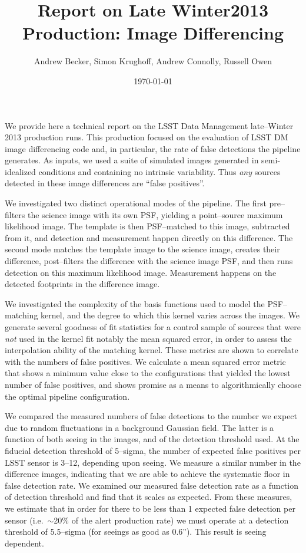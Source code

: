 \documentclass[prd, nofootinbib, floatfix, 11pt,tightenlines,times]{article}
\author{Andrew Becker, Simon Krughoff, Andrew Connolly, Russell Owen\vspace{-2ex}}
\title{Report on Late Winter2013 Production: Image Differencing\vspace{-2ex}}
\date{\vspace{-2ex}\today}
\begin{document}
\maketitle
\vspace{-2ex}
We provide here a technical report on the LSST Data Management
late--Winter 2013 production runs.  This production focused on the
evaluation of LSST DM image differencing code and, in particular, 
the rate of false detections the pipeline generates.  As
inputs, we used a suite of simulated images generated in semi-idealized
conditions and containing no intrinsic variability.  Thus {\it any}
sources detected in these image differences are ``false positives''.

We investigated two distinct operational modes of the pipeline.  The
first pre--filters the science image with its own PSF, yielding a
point--source maximum likelihood image.  The template is then
PSF--matched to this image, subtracted from it, and detection and
measurement happen directly on this difference.  The second mode
matches the template image to the science image, creates their
difference, post--filters the difference with the science image PSF,
and then runs detection on this maximum likelihood image.  Measurement
happens on the detected footprints in the difference image.  

We investigated the complexity of the basis functions used to model
the PSF--matching kernel, and the degree to which this kernel varies
across the images.  We generate several goodness of fit statistics for
a control sample of sources that were {\it not} used in the kernel fit
notably the mean squared error, in order to assess the interpolation ability
of the matching kernel.  These metrics are shown to correlate with the
numbers of false positives.  We calculate a mean squared error metric
that shows a minimum value close to the configurations that yielded
the lowest number of false positives, and shows promise as a means to
algorithmically choose the optimal pipeline configuration.

We compared the measured numbers of false detections to the number we
expect due to random fluctuations in a background Gaussian field.  The
latter is a function of both seeing in the images, and of the
detection threshold used.  At the fiducial detection threshold of
5--sigma, the number of expected false positives per LSST sensor is
3--12, depending upon seeing.  We measure a similar number in the
difference images, indicating that we are able to achieve the
systematic floor in false detection rate.  We examined our measured
false detection rate as a function of detection threshold and find
that it scales as expected.  From these measures, we estimate that in
order for there to be less than 1 expected false detection per sensor
(i.e.\ $\sim$20\% of the alert production rate) we must operate at a
detection threshold of 5.5--sigma (for seeings as good as 0.6''). This
result is seeing dependent.
\end{document}
